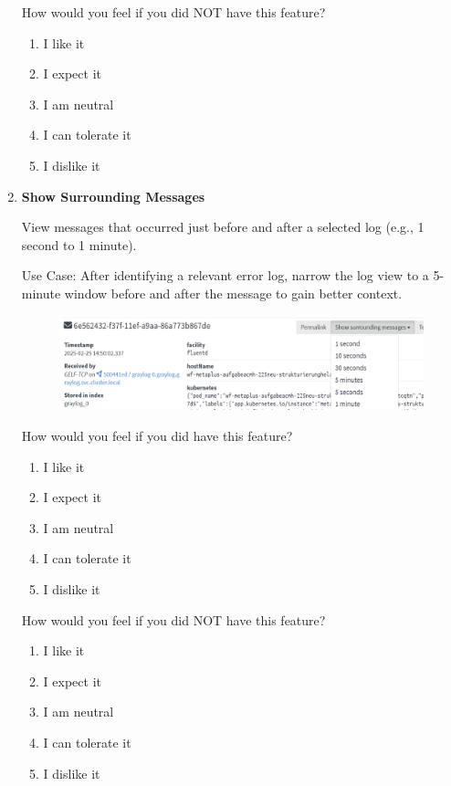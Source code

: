 \documentclass[../main.tex]{subfiles}
\begin{document}
\begin{enumerate}
    How would you feel if you did NOT have this feature?
    
    \begin{enumerate}
        \item I like it
        \item I expect it
        \item  I am neutral
        \item I can tolerate it
        \item I dislike it
    \end{enumerate}

    \clearpage
    \item \textbf{Show Surrounding Messages}
    
    View messages that occurred just before and after a selected log (e.g., 1 second to 1 minute). 
    
    Use Case: After identifying a relevant error log, narrow the log view to a 5-minute window before and after the message to gain better context.

    \begin{figure}[H]
        \centering
        \includegraphics[scale=0.65]{img/10-appendix/surrounding_mes.png}
        \label{fig:surrounding_mes}
    \end{figure}

    How would you feel if you did have this feature?
    
    \begin{enumerate}
        \item I like it
        \item I expect it
        \item  I am neutral
        \item I can tolerate it
        \item I dislike it
    \end{enumerate}

    How would you feel if you did NOT have this feature?
    
    \begin{enumerate}
        \item I like it
        \item I expect it
        \item  I am neutral
        \item I can tolerate it
        \item I dislike it
    \end{enumerate}


\end{enumerate}
\end{document}
